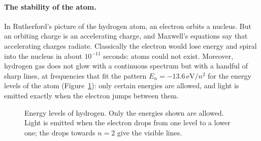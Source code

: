 \paragraph{The stability of the atom.}
In Rutherford's picture of the hydrogen atom, an electron orbits a nucleus. But an orbiting charge is an accelerating charge, and Maxwell's equations say that accelerating charges radiate. Classically the electron would lose energy and spiral into the nucleus in about $10^{-11}$ seconds: atoms could not exist.
Moreover, hydrogen gas does not glow with a continuous spectrum but with a handful of sharp lines, at frequencies that fit the pattern $E_n=-13.6\,\mathrm{eV}/n^2$ for the energy levels of the atom (Figure~\ref{fig:levels}): only certain energies are allowed, and light is emitted exactly when the electron jumps between them.

\begin{figure}[htb]
  \centering
  \caption{Energy levels of hydrogen. Only the energies shown are allowed. Light is emitted when the electron drops from one level to a lower one; the drops towards $n=2$ give the visible lines.}
  \label{fig:levels}
\end{figure}

